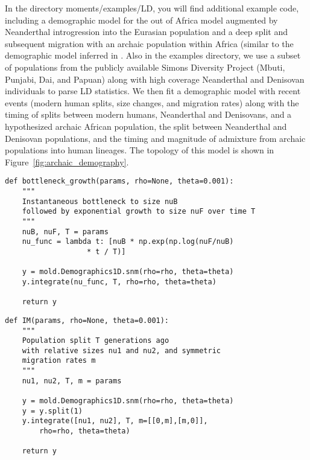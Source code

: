 \documentclass[10pt]{article}
\makeatletter
\renewcommand{\cite}{\citep}
\newcommand{\py}[1]{\lstinline[breaklines=true,language=Python, showstringspaces=False]@#1@}
\makeatother
\begin{document}
In the directory moments/examples/LD, you will find additional example code, including a demographic model for the out of Africa model augmented by Neanderthal introgression into the Eurasian population and a deep split and subsequent migration with an archaic population within Africa (similar to the demographic model inferred in \cite{Ragsdale2019}.
Also in the examples directory, we use a subset of populations from the publicly available Simons Diversity Project (Mbuti, Punjabi, Dai, and Papuan) \cite{Simons} along with high coverage Neanderthal and Denisovan individuals \cite{Pruefer} to parse LD statistics.
We then fit a demographic model with recent events (modern human splits, size changes, and migration rates) along with the timing of splits between modern humans, Neanderthal and Denisovans, and a hypothesized archaic African population, the split between Neanderthal and Denisovan populations, and the timing and magnitude of admixture from archaic populations into human lineages.
The topology of this model is shown in Figure~\ref{fig:archaic_demography}.

\clearpage

\begin{lstlisting}[caption={\textbf{Bottleneck model:} At time \py{T} in the past, an equilibrium population goes through a bottleneck of depth \py{nuB}, recovering to relative size \py{nuF} through exponential growth. In all examples listed here, we need to \py{import numpy as np} and \py{import moments.LD as mold}.}, float, label={lst:bottleneck}]
def bottleneck_growth(params, rho=None, theta=0.001):
    """
    Instantaneous bottleneck to size nuB
    followed by exponential growth to size nuF over time T
    """
    nuB, nuF, T = params
    nu_func = lambda t: [nuB * np.exp(np.log(nuF/nuB) 
    			   * t / T)]

    y = mold.Demographics1D.snm(rho=rho, theta=theta)
    y.integrate(nu_func, T, rho=rho, theta=theta)

    return y
\end{lstlisting}

\begin{lstlisting}[caption={\textbf{IM model:} One population splits into two some time in the past. Each population can have a new size, with symmetric and continuous migration between populations.}, float, label={lst:IM}]
def IM(params, rho=None, theta=0.001):
    """
    Population split T generations ago
    with relative sizes nu1 and nu2, and symmetric
    migration rates m
    """
    nu1, nu2, T, m = params
    
    y = mold.Demographics1D.snm(rho=rho, theta=theta)
    y = y.split(1)
    y.integrate([nu1, nu2], T, m=[[0,m],[m,0]],
        rho=rho, theta=theta)
    
    return y
\end{lstlisting}
\end{document}
